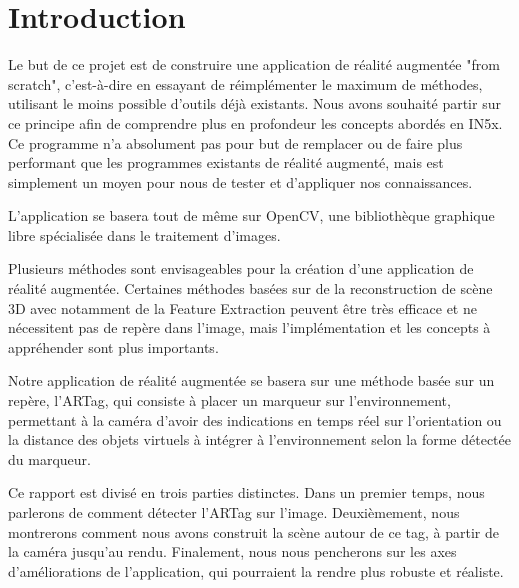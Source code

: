 \part*{Introduction}

Le but de ce projet est de construire une application de réalité augmentée "from scratch", c'est-à-dire en essayant de réimplémenter le maximum de méthodes, utilisant le moins possible d'outils déjà existants. Nous avons souhaité partir sur ce principe afin de comprendre plus en profondeur les concepts abordés en IN5x. Ce programme n'a absolument pas pour but de remplacer ou de faire plus performant que les programmes existants de réalité augmenté, mais est simplement un moyen pour nous de tester et d'appliquer nos connaissances.

L'application se basera tout de même sur OpenCV, une bibliothèque graphique libre spécialisée dans le traitement d'images.

Plusieurs méthodes sont envisageables pour la création d'une application de réalité augmentée. Certaines méthodes basées sur de la reconstruction de scène 3D avec notamment de la Feature Extraction peuvent être très efficace et ne nécessitent pas de repère dans l'image, mais l'implémentation et les concepts à appréhender sont plus importants.

Notre application de réalité augmentée se basera sur une méthode basée sur un repère, l'ARTag, qui consiste à placer un marqueur sur l'environnement, permettant à la caméra d'avoir des indications en temps réel sur l'orientation ou la distance des objets virtuels à intégrer à l'environnement selon la forme détectée du marqueur. 

Ce rapport est divisé en trois parties distinctes. Dans un premier temps, nous parlerons de comment détecter l'ARTag sur l'image. Deuxièmement, nous montrerons comment nous avons construit la scène autour de ce tag, à partir de la caméra jusqu'au rendu. Finalement, nous nous pencherons sur les axes d'améliorations de l'application, qui pourraient la rendre plus robuste et réaliste.
